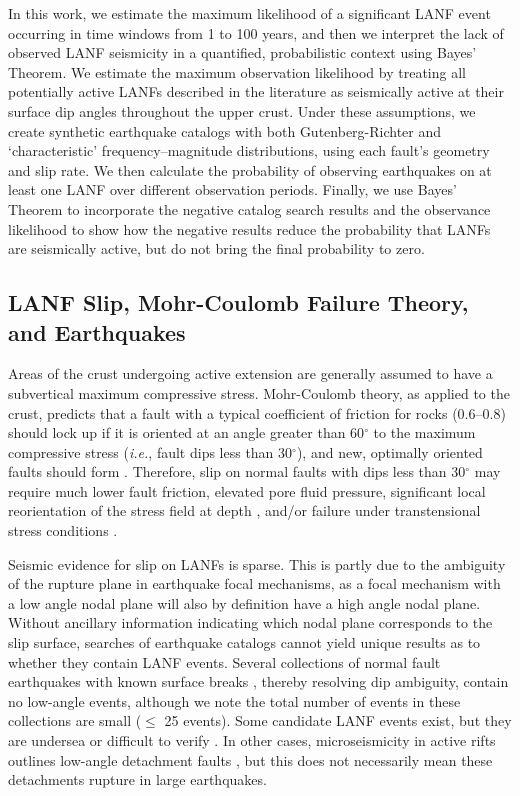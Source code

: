 \documentclass[draft,grl]{AGUTeX}
\begin{document}
\begin{article}
In this work, we estimate the maximum likelihood of a significant LANF event
occurring in time windows from 1 to 100 years, and then we interpret the lack
of observed LANF seismicity in a quantified, probabilistic context using
Bayes' Theorem. We estimate the maximum observation likelihood by treating
all potentially active LANFs described in the literature as seismically active
at their surface dip angles throughout the upper crust. Under these
assumptions, we create synthetic earthquake catalogs with both
Gutenberg-Richter and `characteristic' frequency--magnitude distributions,
using each fault's geometry and slip rate. We then calculate the probability
of observing earthquakes on at least one LANF over different observation
periods. Finally, we use Bayes' Theorem to incorporate the negative catalog
search results and the observance likelihood to show how the negative results
reduce the probability that LANFs are seismically active, but do not bring the
final probability to zero.


\subsection{LANF Slip, Mohr-Coulomb Failure Theory, and Earthquakes}

Areas of the crust undergoing active extension are generally assumed to have
a subvertical maximum compressive stress. Mohr-Coulomb theory, as applied to
the crust, predicts that a fault with a typical coefficient of friction for
rocks (0.6--0.8) should lock up if it is oriented at an angle greater than
60$^\circ$ to the maximum compressive stress ({\it i.e.}, fault dips less than
30$^\circ$), and new, optimally oriented faults should form \citep{sibson1985}.
Therefore, slip on normal faults with dips less than 30$^\circ$ may require
much lower fault friction, elevated pore fluid pressure, significant local
reorientation of the stress field at depth \citep[e.g.,][]
{yin89,selverstone12}, and/or failure under transtensional stress conditions
\citep{axen1994}.

Seismic evidence for slip on LANFs is sparse. This is partly due to the
ambiguity of the rupture plane in earthquake focal mechanisms, as a focal
mechanism with a low angle nodal plane will also by definition have a high
angle nodal plane. Without ancillary information indicating which nodal plane
corresponds to the slip surface, searches of earthquake catalogs cannot yield
unique results as to whether they contain LANF events. Several collections of
normal fault earthquakes with known surface breaks \citep{jackson1987,
collettinisibson2001}, thereby resolving dip ambiguity, contain no low-angle
events, although we note the total number of events in these collections are
small ($\le$ 25 events). Some candidate LANF events exist, but they are
undersea \citep[e.g.,][]{abers2001} or difficult to verify \citep[e.g.,]
[]{doser1987ancash}. In other cases, microseismicity in active rifts outlines
low-angle detachment faults \citep[e.g.][]{monigle2012}, but this does not
necessarily mean these detachments rupture in large earthquakes.


\end{article}
\end{document}
